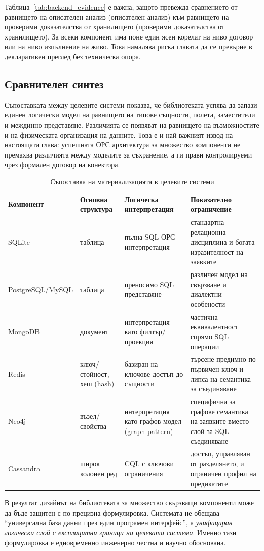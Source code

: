 Таблица~\ref{tab:backend_evidence} е важна, защото превежда сравнението от равнището на описателен анализ (описателен анализ) към равнището на проверими доказателства от хранилището (проверими доказателства от хранилището). За всеки компонент има поне един ясен корелат на ниво договор или на ниво изпълнение на живо. Това намалява риска главата да се превърне в декларативен преглед без техническа опора.

\subsection{Сравнителен синтез}

Съпоставката между целевите системи показва, че библиотеката успява да запази единен логически модел на равнището на типове същности, полета, заместители и междинно представяне. Различията се появяват на равнището на възможностите и на физическата организация на данните. Това е и най-важният извод на настоящата глава: успешната ОРС архитектура за множество компоненти не премахва различията между моделите за съхранение, а ги прави контролируеми чрез формален договор на конектора.

\begin{table}[H]
\centering
\small
\caption{Съпоставка на материализацията в целевите системи}
\label{tab:backend_materialisation}
\begin{tabularx}{\textwidth}{L{2.0cm}L{2.5cm}L{2.8cm}Y}
\toprule
\textbf{Компонент} & \textbf{Основна структура} & \textbf{Логическа интерпретация} & \textbf{Показателно ограничение} \\
\midrule
SQLite & таблица & пълна SQL ОРС интерпретация & стандартна релационна дисциплина и богата изразителност на заявките \\
PostgreSQL/MySQL & таблица & преносимо SQL представяне & различен модел на свързване и диалектни особености \\
MongoDB & документ & интерпретация като филтър/проекция & частична еквивалентност спрямо SQL операции \\
Redis & ключ/стойност, хеш (hash) & базиран на ключове достъп до същности & търсене предимно по първичен ключ и липса на семантика за съединяване \\
Neo4j & възел/свойства & интерпретация като графов модел (graph-pattern) & специфична за графове семантика на заявките вместо слой за SQL съединяване \\
Cassandra & широк колонен ред & CQL с ключови ограничения & достъп, управляван от разделянето, и ограничен профил на предикатите \\
\bottomrule
\end{tabularx}
\end{table}

В резултат дизайнът на библиотеката за множество свързващи компоненти може да бъде защитен с по-прецизна формулировка. Системата не обещава ``универсална база данни през един програмен интерфейс'', а \emph{унифициран логически слой с експлицитни граници на целевата система}. Именно тази формулировка е едновременно инженерно честна и научно обоснована.
